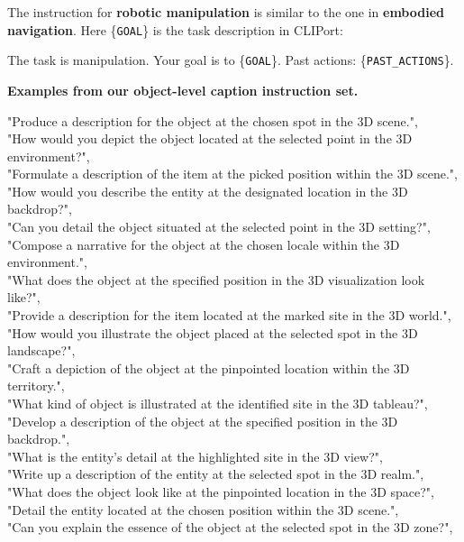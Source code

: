 The instruction for \textbf{robotic manipulation} is similar to the one in \textbf{embodied navigation}. Here \{\texttt{GOAL}\} is the task description in CLIPort:
\begin{tcolorbox}
\begin{minipage}{\linewidth}
The task is manipulation. Your goal is to \{\texttt{GOAL}\}. Past actions: \{\texttt{PAST\_ACTIONS}\}.
\end{minipage}
\end{tcolorbox}


\begin{table}[t!]
\caption{\textbf{Examples from our object-level caption instruction set.}}
\vspace{-4pt}
\begin{tcolorbox}
\begin{minipage}{\linewidth}
"Produce a description for the object at the chosen spot in the 3D scene.",\\
    "How would you depict the object located at the selected point in the 3D environment?",\\
    "Formulate a description of the item at the picked position within the 3D scene.",\\
    "How would you describe the entity at the designated location in the 3D backdrop?",\\
    "Can you detail the object situated at the selected point in the 3D setting?",\\
    "Compose a narrative for the object at the chosen locale within the 3D environment.",\\
    "What does the object at the specified position in the 3D visualization look like?",\\
    "Provide a description for the item located at the marked site in the 3D world.",\\
    "How would you illustrate the object placed at the selected spot in the 3D landscape?",\\
    "Craft a depiction of the object at the pinpointed location within the 3D territory.",\\
    "What kind of object is illustrated at the identified site in the 3D tableau?",\\
    "Develop a description of the object at the specified position in the 3D backdrop.",\\
    "What is the entity's detail at the highlighted site in the 3D view?",\\
    "Write up a description of the entity at the selected spot in the 3D realm.",\\
    "What does the object look like at the pinpointed location in the 3D space?",\\
    "Detail the entity located at the chosen position within the 3D scene.",\\
    "Can you explain the essence of the object at the selected spot in the 3D zone?",
\end{minipage}
\end{tcolorbox}

\label{tab:obj-level_cap}
\end{table}
